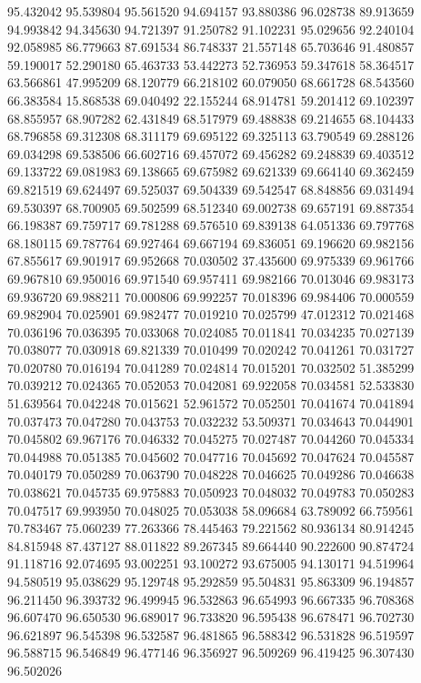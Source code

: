 95.432042
95.539804
95.561520
94.694157
93.880386
96.028738
89.913659
94.993842
94.345630
94.721397
91.250782
91.102231
95.029656
92.240104
92.058985
86.779663
87.691534
86.748337
21.557148
65.703646
91.480857
59.190017
52.290180
65.463733
53.442273
52.736953
59.347618
58.364517
63.566861
47.995209
68.120779
66.218102
60.079050
68.661728
68.543560
66.383584
15.868538
69.040492
22.155244
68.914781
59.201412
69.102397
68.855957
68.907282
62.431849
68.517979
69.488838
69.214655
68.104433
68.796858
69.312308
68.311179
69.695122
69.325113
63.790549
69.288126
69.034298
69.538506
66.602716
69.457072
69.456282
69.248839
69.403512
69.133722
69.081983
69.138665
69.675982
69.621339
69.664140
69.362459
69.821519
69.624497
69.525037
69.504339
69.542547
68.848856
69.031494
69.530397
68.700905
69.502599
68.512340
69.002738
69.657191
69.887354
66.198387
69.759717
69.781288
69.576510
69.839138
64.051336
69.797768
68.180115
69.787764
69.927464
69.667194
69.836051
69.196620
69.982156
67.855617
69.901917
69.952668
70.030502
37.435600
69.975339
69.961766
69.967810
69.950016
69.971540
69.957411
69.982166
70.013046
69.983173
69.936720
69.988211
70.000806
69.992257
70.018396
69.984406
70.000559
69.982904
70.025901
69.982477
70.019210
70.025799
47.012312
70.021468
70.036196
70.036395
70.033068
70.024085
70.011841
70.034235
70.027139
70.038077
70.030918
69.821339
70.010499
70.020242
70.041261
70.031727
70.020780
70.016194
70.041289
70.024814
70.015201
70.032502
51.385299
70.039212
70.024365
70.052053
70.042081
69.922058
70.034581
52.533830
51.639564
70.042248
70.015621
52.961572
70.052501
70.041674
70.041894
70.037473
70.047280
70.043753
70.032232
53.509371
70.034643
70.044901
70.045802
69.967176
70.046332
70.045275
70.027487
70.044260
70.045334
70.044988
70.051385
70.045602
70.047716
70.045692
70.047624
70.045587
70.040179
70.050289
70.063790
70.048228
70.046625
70.049286
70.046638
70.038621
70.045735
69.975883
70.050923
70.048032
70.049783
70.050283
70.047517
69.993950
70.048025
70.053038
58.096684
63.789092
66.759561
70.783467
75.060239
77.263366
78.445463
79.221562
80.936134
80.914245
84.815948
87.437127
88.011822
89.267345
89.664440
90.222600
90.874724
91.118716
92.074695
93.002251
93.100272
93.675005
94.130171
94.519964
94.580519
95.038629
95.129748
95.292859
95.504831
95.863309
96.194857
96.211450
96.393732
96.499945
96.532863
96.654993
96.667335
96.708368
96.607470
96.650530
96.689017
96.733820
96.595438
96.678471
96.702730
96.621897
96.545398
96.532587
96.481865
96.588342
96.531828
96.519597
96.588715
96.546849
96.477146
96.356927
96.509269
96.419425
96.307430
96.502026
